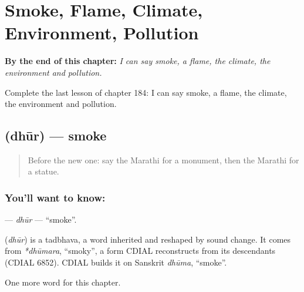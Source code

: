 
\chapter{Smoke, Flame, Climate, Environment, Pollution}
\label{ch:mr-smoke-flame-climate-environment-pollution}

\begin{chapteropening}
\textbf{By the end of this chapter:} \emph{I can say smoke, a flame, the climate, the environment and pollution.}

Complete the last lesson of chapter 184: I can say smoke, a flame, the climate, the environment and pollution.
\end{chapteropening}

\section[\texorpdfstring{\mr{धूर} (dhūr)}{धूर (dhūr)}]{ (dhūr) — smoke}

\label{lesson:MR-C184-dhur}



\begin{quote}
Before the new one: say the Marathi for a monument, then the Marathi for a statue.
\end{quote}

\subsection*{You'll want to know: }
\textbf{} — \emph{dhūr} — \textquotedblleft{}smoke\textquotedblright{}.

\begin{cousinweb}
\textbf{} (\emph{dhūr}) is a tadbhava, a word inherited and reshaped by sound change. It comes from \emph{*dhūmara}, \textquotedblleft{}smoky\textquotedblright{}, a form CDIAL reconstructs from its descendants (CDIAL 6852). CDIAL builds it on Sanskrit \emph{dhūma}, \textquotedblleft{}smoke\textquotedblright{}.
\end{cousinweb}

\begin{grammarlens}[title={What you've built}]
One more word for this chapter.
\end{grammarlens}

